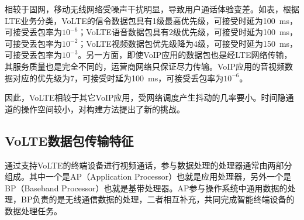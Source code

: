 
相较于固网，移动无线网络受噪声干扰明显，导致用户通话体验变差。如表，根据LTE业务分类，VoLTE的信令数据包具有1级最高优先级，可接受时延为{100\ ms}，可接受丢包率为$10^{-6}$；VoLTE语音数据包具有2级优先级，可接受时延为{100\ ms}，可接受丢包率为$10^{-2}$；VoLTE视频数据包优先级降为4级，可接受时延为{150\ ms}，可接受丢包率为$10^{-3}$。另一方面，即使VoIP应用的数据包也是经LTE网络传输，其服务质量也是完全不同的，运营商网络只保证尽力传输。VoIP应用的音视频数据对应的优先级为7，可接受时延为{100\ ms}，可接受丢包率为$10^{-6}$。

因此，VoLTE相较于其它VoIP应用，受网络调度产生抖动的几率要小。时间隐通道的操作空间较小，对构建方法提出了新的挑战。

\subsection{VoLTE数据包传输特征}
\label{chap:backinfo:volte:packets}
通过支持VoLTE的终端设备进行视频通话，参与数据处理的处理器通常由两部分组成。其中一个是AP（Application Processor）也就是应用处理器，另外一个是BP（Baseband Processor）也就是基带处理器。AP参与操作系统中通用数据的处理，BP负责的是无线通信数据的处理，二者相互补充，共同完成智能终端设备的数据处理任务。

